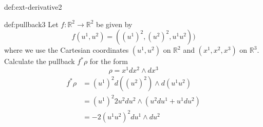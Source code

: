 \documentclass[landscape, 8pt]{extarticle}
\begin{document}
\begin{multicols}{3}
\begin{xmp}{def:ext-derivative}{2}
\end{xmp}

\begin{xmp}{def:pullback}{3}
Let \(f:\mathbb{R}^{2} \to \mathbb{R}^{2}\) be given by
\[f(u^{1}, u^{2}) = ((u^{1})^{2}, (u^{2})^{2}, u^{1}u^{2}))\]
where we use the Cartesian coordinates \((u^{1}, u^{2})\) on \(\mathbb{R}^{2}\) and \((x^{1}, x^{2}, x^{3})\) on \(\mathbb{R}^{3}\). Calculate the pullback \(f^{*}\rho\) for the form
\[\rho = x^{1}dx^{2}\wedge dx^{3}\]
\begin{align*}
    f^*\rho &= (u^{1})^{2}d((u^{2})^{2}) \wedge d(u^{1}u^{2}) \\
    &= (u^{1})^{2} 2u^{2}du^{2} \wedge (u^{2} du^{1} + u^{1}du^{2}) \\
    &= -2(u^{1}u^{2})^{2}du^{1} \wedge du^{2}
\end{align*}

\end{xmp}




\end{multicols}
\end{document}
